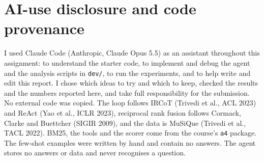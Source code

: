 \documentclass[10pt,a4paper]{article}
\begin{document}
\vfill
\section{AI-use disclosure and code provenance}
I used Claude Code (Anthropic, Claude Opus 5.5) as an assistant throughout this assignment: to understand the
starter code, to implement and debug the agent and the analysis scripts in \texttt{dev/}, to run the experiments, and
to help write and edit this report. I chose which ideas to try and which to keep, checked the results and the
numbers reported here, and take full responsibility for the submission. No external code was copied. The loop follows IRCoT (Trivedi et
al., ACL 2023) and ReAct (Yao et al., ICLR 2023), reciprocal rank fusion follows Cormack, Clarke and Buettcher
(SIGIR 2009), and the data is MuSiQue (Trivedi et al., TACL 2022). BM25, the tools and the scorer come from the
course's \texttt{a4} package. The few-shot examples were written by hand and contain no answers. The agent stores
no answers or data and never recognises a question.
\end{document}
